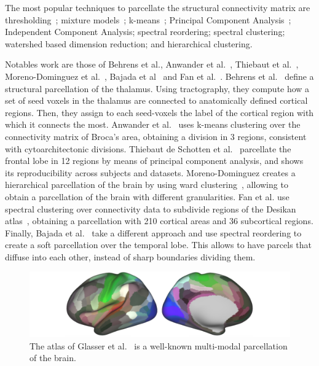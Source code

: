 The most popular techniques to parcellate the structural connectivity matrix
are thresholding~\cite{Behrens2003}; mixture models~\cite{Jbabdi2009, Clarkson2010, Paristot2015};
k-means~\cite{Anwander2006}; Principal Component Analysis~\cite{ThiebautdeSchotten2014, ThiebautdeSchotten2016};
Independent Component Analysis\cite{Muircheartaigh2018}; spectral reordering\cite{Bajada2017}; spectral clustering\cite{Fan2016};
watershed based dimension reduction\cite{Roca2009, Lefranc2016}; and hierarchical clustering\cite{Moreno-Dominguez2014, Gallardo2017a}.

Notables work are those of Behrens et al.\cite{Behrens2003}, Anwander et al.~\cite{Anwander2006},
Thiebaut et al.~\cite{ThiebautdeSchotten2016}, Moreno-Dominguez et al.~\cite{Moreno-Dominguez2014},
Bajada et al~\cite{Bajada2017} and Fan et al.~\cite{Fan2016}.
Behrens et al.~\cite{Behrens2003} define a structural parcellation of the thalamus.
Using tractography, they compute how a set of seed voxels in the thalamus are
connected to anatomically defined cortical regions. Then, they assign to each
seed-voxels the label of the cortical region with which it connects the most.
Anwander et al.~\cite{Anwander2006}
uses k-means clustering over the connectivity matrix of Broca's area, obtaining
a division in 3 regions, consistent with cytoarchitectonic divisions.
Thiebaut de Schotten et al.~\cite{ThiebautdeSchotten2016}
parcellate the frontal lobe in 12 regions by means of principal component analysis,
and shows its reproducibility across subjects and datasets.
Moreno-Dominguez creates a hierarchical parcellation of the brain by using
ward clustering~\cite{Moreno-Dominguez2014}, allowing to obtain a parcellation
of the brain with different granularities. Fan et al.\cite{Fan2016} use
spectral clustering over connectivity data to subdivide regions of the Desikan
atlas~\cite{Desikan2006}, obtaining a parcellation with 210 cortical areas and
36 subcortical regions. Finally, Bajada et al.~\cite{Bajada2017} take a different
approach and use spectral reordering to create a soft parcellation over the
temporal lobe. This allows to have parcels that diffuse into each other, instead
of sharp boundaries dividing them.

\begin{figure}[t]
    \includegraphics[width=\textwidth]{4.brain_parcellation/img/multimodal.png}
    \caption{The atlas of Glasser et al.~\cite{Glasser2016} is a well-known
             multi-modal parcellation of the brain.}
    \label{fig:brain_function}
\end{figure}

